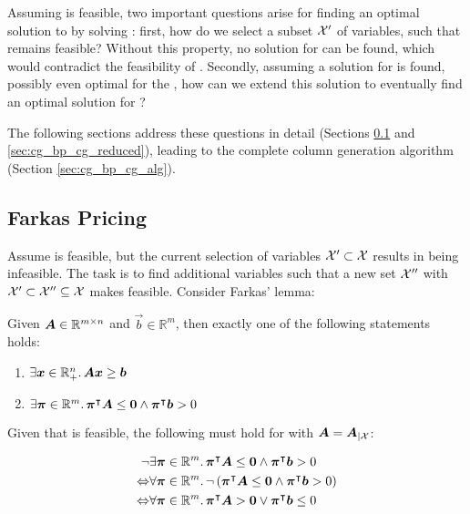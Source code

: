 Assuming \MP{} is feasible, two important questions arise for finding an optimal solution to \MP{} by solving \RMP{}: first, how do we select a subset $\mathcal{X}'$ of variables, such that \RMP{} remains feasible? Without this property, no solution for \RMP{} can be found, which would contradict the feasibility of \MP{}. Secondly, assuming a solution for \RMP{} is found, possibly even optimal for the \RMP{}, how can we extend this solution to eventually find an optimal solution for \MP{}?

The following sections address these questions in detail (Sections \ref{sec:cg_bp_cg_farkas} and \ref{sec:cg_bp_cg_reduced}), leading to the complete column generation algorithm (Section \ref{sec:cg_bp_cg_alg}).

\subsection{Farkas Pricing \FP{}}\label{sec:cg_bp_cg_farkas}
Assume \MP{} is feasible, but the current selection of variables $\mathcal{X}' \subset \mathcal{X}$ results in \RMP{} being infeasible. The task is to find additional variables such that a new set $\mathcal{X}''$ with $\mathcal{X}' \subset \mathcal{X}'' \subseteq \mathcal{X}$ makes \RMP{} feasible. Consider Farkas' lemma:

\begin{theorem}\label{th:farkas_lemma}
Given ${\bm{A}} \in \mathbb{R}^{m \times n}$ and $\vec{b} \in \mathbb{R}^m$, then exactly one of the following statements holds:
\begin{enumerate}
	\item $\exists {\bm{x}} \in \mathbb{R}_+^n. \, {\bm{A}} {\bm{x}} \geq {\bm{b}}$
	\item $\exists {\bm{\pi}} \in \mathbb{R}^m. \, {\bm{\pi}}^\intercal {\bm{A}} \leq {\bm{0}} \land {\bm{\pi}}^\intercal {\bm{b}} > 0$
\end{enumerate}
\end{theorem}

Given that \MP{} is feasible, the following must hold for \MP{} with ${\bm{A}} = {\bm{A}}_{\vert \mathcal{X}}$:

\begin{equation}
\begin{aligned}
\neg & \exists {\bm{\pi}} \in \mathbb{R}^m. \, {\bm{\pi}}^\intercal {\bm{A}} \leq {\bm{0}} \land {\bm{\pi}}^\intercal {\bm{b}} > 0 \\
\Leftrightarrow & \forall {\bm{\pi}} \in \mathbb{R}^m. \, \neg \left( {\bm{\pi}}^\intercal {\bm{A}} \leq {\bm{0}} \land {\bm{\pi}}^\intercal {\bm{b}} > 0 \right)\\
\Leftrightarrow & \forall {\bm{\pi}} \in \mathbb{R}^m. \, {\bm{\pi}}^\intercal {\bm{A}} > {\bm{0}} \lor {\bm{\pi}}^\intercal {\bm{b}} \leq 0
\end{aligned}
\end{equation}

